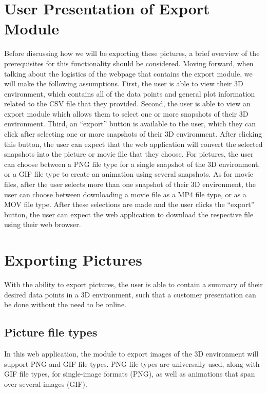 \documentclass[letterpaper,10pt,titlepage, onecolumn, draftclsnofoot]{IEEEtran}
\begin{document}
\section{User Presentation of Export Module}
Before discussing how we will be exporting these pictures, a brief overview of the prerequisites for this functionality should be considered. Moving forward, when talking about the logistics of the webpage that contains the export module, we will make the following assumptions. \newline
\indent First, the user is able to view their 3D environment, which contains all of the data points and general plot information related to the CSV file that they provided. Second, the user is able to view an export module which allows them to select one or more snapshots of their 3D environment. Third, an “export” button is available to the user, which they can click after selecting one or more snapshots of their 3D environment. After clicking this button, the user can expect that the web application will convert the selected snapshots into the picture or movie file that they choose. \newline
\indent For pictures, the user can choose between a PNG file type for a single snapshot of the 3D environment, or a GIF file type to create an animation using several snapshots. As for movie files, after the user selects more than one snapshot of their 3D environment, the user can choose between downloading a movie file as a MP4 file type, or as a MOV file type. After these selections are made and the user clicks the “export” button, the user can expect the web application to download the respective file using their web browser.  \newline

\section{Exporting Pictures}
With the ability to export pictures, the user is able to contain a summary of their desired data points in a 3D environment, such that a customer presentation can be done without the need to be online. 

\subsection{Picture file types}
In this web application, the module to export images of the 3D environment will support PNG and GIF file types. PNG file types are universally used, along with GIF file types, for single-image formats (PNG), as well as animations that span over several images (GIF).	
\end{document}
